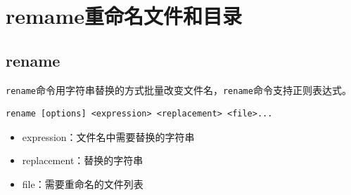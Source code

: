 \documentclass[12pt, openany, oneside]{book}
\begin{document}
\begin{table}[H]
	\centering
	\caption{\lstinline|mv|参数说明}
\end{table}

\newpage

\section{remame重命名文件和目录}

\subsection{rename}

\lstinline|rename|命令用字符串替换的方式批量改变文件名，\lstinline|rename|命令支持正则表达式。

\vspace{-0.5cm}
\begin{lstlisting}
rename [options] <expression> <replacement> <file>...
\end{lstlisting}

\begin{itemize}
	\item expression：文件名中需要替换的字符串

	\item replacement：替换的字符串

	\item file：需要重命名的文件列表
\end{itemize}
\end{document}
